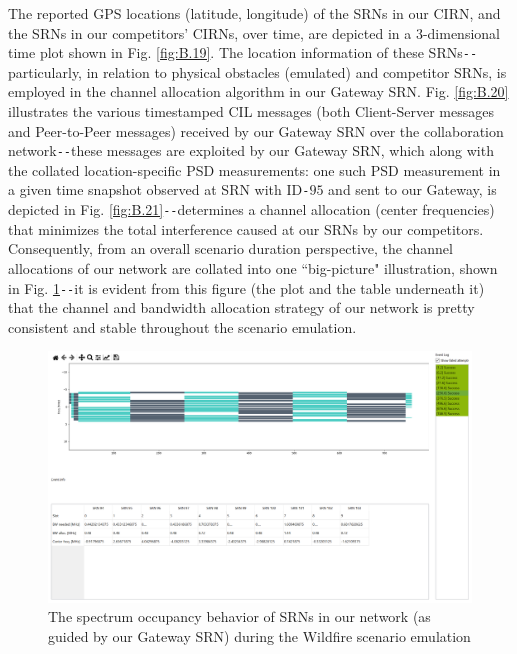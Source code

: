 The reported GPS locations (latitude, longitude) of the SRNs in our CIRN, and the SRNs in our competitors' CIRNs, over time, are depicted in a $3$-dimensional time plot shown in Fig. \ref{fig:B.19}. The location information of these SRNs\texttt{-{}-}particularly, in relation to physical obstacles (emulated) and competitor SRNs, is employed in the channel allocation algorithm in our Gateway SRN. Fig. \ref{fig:B.20} illustrates the various timestamped CIL messages (both Client-Server messages and Peer-to-Peer messages) received by our Gateway SRN over the collaboration network\texttt{-{}-}these messages are exploited by our Gateway SRN, which along with the collated location-specific PSD measurements: one such PSD measurement in a given time snapshot observed at SRN with ID\texttt{-}$95$ and sent to our Gateway, is depicted in Fig. \ref{fig:B.21}\texttt{-{}-}determines a channel allocation (center frequencies) that minimizes the total interference caused at our SRNs by our competitors. Consequently, from an overall scenario duration perspective, the channel allocations of our network are collated into one ``big-picture" illustration, shown in Fig. \ref{fig:B.22}\texttt{-{}-}it is evident from this figure (the plot and the table underneath it) that the channel and bandwidth allocation strategy of our network is pretty consistent and stable throughout the scenario emulation.
\begin{figure} [htb]
    \centerline{
    \includegraphics[width = 1.0\textwidth]{Wildfire_Channel_Alloc.PNG}}
    \caption{The spectrum occupancy behavior of SRNs in our network (as guided by our Gateway SRN) during the Wildfire scenario emulation}
    \label{fig:B.22}
\end{figure}
